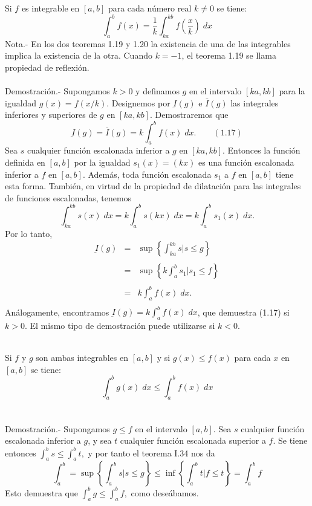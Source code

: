 \begin{multicols}{2}
\begin{teo} Si $f$ es integrable en $[a,b]$ para cada número real $k\neq 0$ se tiene: $$\int_a^b f(x) = \dfrac{1}{k} \int_{ka}^{kb} f\left(\dfrac{x}{k}\right)\; dx$$
    Nota.-\; En los dos teoremas 1.19 y 1.20 la existencia de una de las integrables implica la existencia de la otra. Cuando $k=-1$, el teorema 1.19 se llama propiedad de reflexión.\\\\
    Demostración.-\; Supongamos $k>0$ y definamos $g$ en el intervalo $[ka,kb]$ para la igualdad $g(x)=f(x/k)$. Designemos por $\underbar{I}(g)$ e $\bar{I}(g)$ las integrales inferiores y superiores de $g$ en $[ka,kb]$. Demostraremos que $$\underbar{I}(g) = \bar{I}(g) = k \int_a^b f(x) \; dx. \qquad (1.17)$$
    Sea $s$ cualquier función escalonada inferior a $g$ en $[ka,kb]$. Entonces la función definida en $[a,b]$ por la igualdad $s_1(x) = (kx)$ es una función escalonada inferior a $f$ en $[a,b]$. Además, toda función escalonada $s_1$ a $f$ en $[a,b]$ tiene esta forma. También, en virtud de la propiedad de dilatación para las integrales de funciones escalonadas, tenemos 
    $$\int_{ka}^{kb} s(x)\; dx = k \int_a^b s(kx)\; dx = k \int_a^b s_1(x) \; dx.$$
    Por lo tanto, 
    $$\begin{array}{rcl}
	\underbar{I}(g) &=& \sup\left\{\int_{ka}^{kb} s | s\leq g\right\}\\\\ 
			&=& \sup\left\{ k \int_a^b s_1 | s_1\leq f\right\}\\\\ 
			&=& k \displaystyle\int_a^b f(x) \; dx.\\
    \end{array}$$
    Análogamente, encontramos $\underbar{I}(g) = k \int_a^b f(x)\; dx$, que demuestra (1.17) si $k>0.$ El mismo tipo de demostración puede utilizarse si $k<0$.\\\\

\end{teo}

\begin{teo} Si $f$ y $g$ son ambas integrables en $[a,b]$ y si $g(x)\leq f(x)$ para cada $x$ en $[a,b]$ se tiene: $$\int_a^b g(x)\; dx \leq \int_a^b f(x)\; dx$$\\\\
    Demostración.-\; Supongamos $g\leq f$ en el intervalo $[a,b]$. Sea $s$ cualquier función escalonada inferior a $g$, y sea $t$ cualquier función escalonada superior a $f$. Se tiene entonces $\int_a^b s \leq \int_a^b t,$ y por tanto el teorema I.34 nos da 
    $$\int_a^b = \sup \left\{\int_a^b s | s\leq g \right\} \leq \inf \left\{\int_a^b t | f\leq t\right\} = \int_a^b f$$
    Esto demuestra que $\int_a^b g \leq \int_a^b f,$ como deseábamos.\\\\

\end{teo}

\end{multicols}

